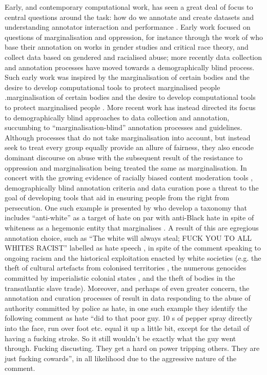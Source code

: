 Early, and contemporary computational work, has seen a great deal of focus to central questions around the task: how do we annotate and create datasets \citep{Waseem-Hovy:2016,Waseem:2017,Vidgen:2020} and understanding annotator interaction and performance \citep{Ross:2016,Waseem:2016,Vidgen:dynabench:2021}.
Early work focused on questions of marginalisation and oppression, for instance through the work of \citet{Waseem-Hovy:2016} who base their annotation on works in gender studies and critical race theory, and collect data based on gendered and racialised abuse; more recently data collection and annotation processes have moved towards a demographically blind process. Such early work was inspired by the marginalisation of certain bodies and the desire to develop computational tools to protect marginalised people \citep{Warner:2012}.marginalisation of certain bodies and the desire to develop computational tools to protect marginalised people \citep{Warner:2012}.
More recent work has instead directed its focus to demographically blind approaches to data collection and annotation, succumbing to ``marginalisation-blind'' annotation processes and guidelines. Although processes that do not take marginalisation into account, but instead seek to treat every group equally provide an allure of fairness, they also encode dominant discourse on abuse with the subsequent result of the resistance to oppression and marginalisation being treated the same as marginalisation. In concert with the growing evidence of racially biased content moderation tools \citep{Waseem:2018,Davidson:2019}, demographically blind annotation criteria and data curation pose a threat to the goal of developing tools that aid in ensuring people from the right from persecution. One such example is presented by \citet{Salminen:2018} who develop a taxonomy that includes ``anti-white'' as a target of hate on par with anti-Black hate in spite of whiteness as a hegemonic entity that marginalises \citep{McIntosh:1988}.
A result of this are egregious annotation choice, such as ``The  white  will  always  steal;  FUCK  YOU  TO  ALL  WHITES  RACIST'' labelled as hate speech \citep{Salminen:2018}, in spite of the comment speaking to ongoing racism and the historical exploitation enacted by white societies (e.g. the theft of cultural artefacts from colonised territories \citep{Frost:2019}, the numerous genocides committed by imperialistic colonial states \citep{Weisbord:2003}, and the theft of bodies in the transatlantic slave trade). Moreover, and perhaps of even greater concern, the annotation and curation processes of \citet{Salminen:2018} result in data responding to the abuse of authority committed by police as hate, in one such example they identify the following comment as hate ``did to that poor guy. 10 s of pepper spray directly into the face, run over foot etc. equal it up a little bit, except for the detail of having a fucking stroke. So it still wouldn’t be exactly what the guy went through. Fucking discusting. They get a hard on power tripping others. They are just fucking cowards'', in all likelihood due to the aggressive nature of the comment.

